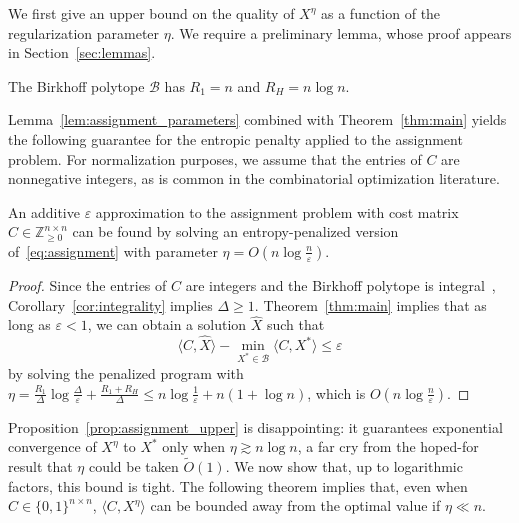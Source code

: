 \documentclass[final,12pt]{colt2018}
\newcommand{\cB}{\mathcal{B}}
\newcommand{\ZZ}{\mathbb{Z}}
\newcommand{\1}{\mathds{1}}
\newcommand*{\ep}{\varepsilon}
\begin{document}
We first give an upper bound on the quality of $X^\eta$ as a function of the regularization parameter $\eta$.
We require a preliminary lemma, whose proof appears in Section~\ref{sec:lemmas}.

\begin{lemma}\label{lem:assignment_parameters}
The Birkhoff polytope $\cB$ has $R_1 = n$ and $R_H = n \log n$.
\end{lemma}


Lemma~\ref{lem:assignment_parameters} combined with Theorem~\ref{thm:main} yields the following guarantee for the entropic penalty applied to the assignment problem.
For normalization purposes, we assume that the entries of $C$ are nonnegative integers, as is common in the combinatorial optimization literature.
\begin{proposition}\label{prop:assignment_upper}
An additive $\ep$ approximation to the assignment problem with cost matrix $C \in \ZZ_{\geq 0}^{n \times n}$ can be found by solving an entropy-penalized version of~\eqref{eq:assignment} with parameter $\eta = O\left(n \log \frac n \ep\right)$.
\end{proposition}
\begin{proof}
Since the entries of $C$ are integers and the Birkhoff polytope is integral~\citep{Sch03}, Corollary~\ref{cor:integrality} implies $\Delta \geq 1$.
Theorem~\ref{thm:main} implies that as long as $\ep < 1$, we can obtain a solution $\hat X$ such that
\begin{equation*}
\langle C, \hat X \rangle - \min_{X^* \in \cB} \langle C, X^* \rangle \leq \ep
\end{equation*}
by solving the penalized program with $\eta = \frac{R_1}{\Delta}\log \frac \Delta \ep + \frac{R_1 + R_H}{\Delta} \leq n \log \frac 1 \ep + n(1 + \log n)$, which is $O\left(n \log \frac n \ep\right)$.
\end{proof}
Proposition~\ref{prop:assignment_upper} is disappointing: it guarantees exponential convergence of $X^\eta$ to $X^*$ only when $\eta \gtrsim n \log n$, a far cry from the hoped-for result that $\eta$ could be taken $\tilde O(1)$.
We now show that, up to logarithmic factors, this bound is tight.
The following theorem implies that, even when $C \in \{0, 1\}^{n \times n}$, $\langle C, X^\eta \rangle$ can be bounded away from the optimal value if $\eta \ll n$.
\end{document}
